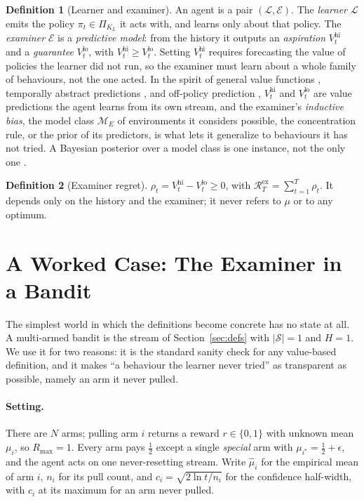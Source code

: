 \documentclass[10pt]{article} %
\theoremstyle{definition}
\newtheorem{definition}{Definition}
\theoremstyle{plain}
\newcommand{\ModE}{\mathcal{M}_E}
\newcommand{\PiK}{\Pi_{K_L}}
\newcommand{\Vlow}{V^{\mathrm{lo}}_t}
\newcommand{\Vhi}{V^{\mathrm{hi}}_t}
\newcommand{\Rex}{\mathcal{R}^{\mathrm{ex}}}
\newcommand{\Rmax}{R_{\max}}
\begin{document}
\begin{definition}[Learner and examiner]
\label{def:agent}
An agent is a pair $(\mathcal{L},\mathcal{E})$. The \emph{learner} $\mathcal{L}$ emits the policy $\pi_t \in \PiK$ it acts with, and learns only about that policy. The \emph{examiner} $\mathcal{E}$ is a \emph{predictive model}: from the history it outputs an \emph{aspiration} $\Vhi$ and a \emph{guarantee} $\Vlow$, with $\Vhi \ge \Vlow$. Setting $\Vhi$ requires forecasting the value of policies the learner did not run, so the examiner must learn about a whole family of behaviours, not the one acted. In the spirit of general value functions \citep{sutton2011horde,modayil2014nexting}, temporally abstract predictions \citep{suttonprecupsingh1999}, and off-policy prediction \citep{precup2001offpolicy}, $\Vhi$ and $\Vlow$ are value predictions the agent learns from its own stream, and the examiner's \emph{inductive bias}, the model class $\ModE$ of environments it considers possible, the concentration rule, or the prior of its predictors, is what lets it generalize to behaviours it has not tried. A Bayesian posterior over a model class is one instance, not the only one \citep{osband2013psrl}.
\end{definition}

\begin{definition}[Examiner regret]
\label{def:exreg}
$\rho_t = \Vhi - \Vlow \ge 0$, with $\Rex_T = \sum_{t=1}^T \rho_t$. It depends only on the history and the examiner; it never refers to $\mu$ or to any optimum.
\end{definition}

\section{A Worked Case: The Examiner in a Bandit}
\label{sec:bandit}

The simplest world in which the definitions become concrete has no state at all. A multi-armed bandit is the stream of Section~\ref{sec:defs} with $|\mathcal{S}|=1$ and $H=1$. We use it for two reasons: it is the standard sanity check for any value-based definition, and it makes ``a behaviour the learner never tried'' as transparent as possible, namely an arm it never pulled.

\paragraph{Setting.} There are $N$ arms; pulling arm $i$ returns a reward $r\in\{0,1\}$ with unknown mean $\mu_i$, so $\Rmax=1$. Every arm pays $\tfrac12$ except a single \emph{special} arm with $\mu_{i^\star}=\tfrac12+\epsilon$, and the agent acts on one never-resetting stream. Write $\hat\mu_i$ for the empirical mean of arm $i$, $n_i$ for its pull count, and $c_i=\sqrt{2\ln t/n_i}$ for the confidence half-width, with $c_i$ at its maximum for an arm never pulled.
\end{document}
